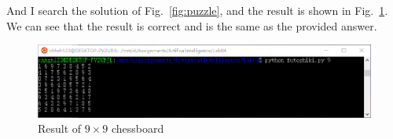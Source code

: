 ﻿\documentclass[a4paper, 11pt]{article}
\begin{document}
And I search the solution of Fig.~\ref{fig:puzzle}, and the result is shown in Fig.~\ref{fig:res9}.
We can see that the result is correct and is the same as the provided answer.
\begin{figure}[H]
\centering
\includegraphics[width=\linewidth]{fig/result9.png}
\caption{Result of $9\times 9$ chessboard}
\label{fig:res9}
\end{figure}

%
%
\end{document}
